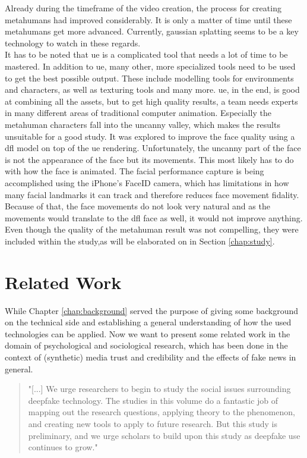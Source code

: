 \documentclass[
  a4paper,  %
  twoside,  %
  bibliography=totoc,
  headsepline,
  cleardoublepage=empty,
  parskip=half,
  draft=false
]{scrbook}
\begin{document}
Already during the timeframe of the video creation, the process for creating metahumans had improved considerably. It is only a matter of time until these metahumans get more advanced. Currently, gaussian splatting seems to be a key technology to watch in these regards. \\
It has to be noted that \gls{ue} is a complicated tool that needs a lot of time to be mastered. In addition to \gls{ue}, many other, more specialized tools need to be used to get the best possible output. These include modelling tools for environments and characters, as well as texturing tools and many more. \gls{ue}, in the end, is good at combining all the assets, but to get high quality results, a team needs experts in many different areas of traditional computer animation. Especially the metahuman characters fall into the uncanny valley, which makes the results unsuitable for a good study. It was explored to improve the face quality using a \gls{dfl} model on top of the \gls{ue} rendering. Unfortunately, the uncanny part of the face is not the appearance of the face but its movements. This most likely has to do with how the face is animated. The facial performance capture is being accomplished using the iPhone's FaceID camera, which has limitations in how many facial landmarks it can track and therefore reduces face movement fidality. Because of that, the face movements do not look very natural and as the movements would translate to the \gls{dfl} face as well, it would not improve anything. \\
Even though the quality of the metahuman result was not compelling, they were included  within the study,as will be elaborated on in Section \ref{chap:study}. 

\chapter{Related Work}
\label{chap:rel-work}
While Chapter \ref{chap:background} served the purpose of giving some background on the technical side and establishing a general understanding of how the used technologies can be applied. Now we want to present some related work in the domain of psychological and sociological research, which has been done in the context of (synthetic) media trust and credibility and the effects of fake news in general. 

\begin{quotation}
  "[...] We urge researchers to begin to study the social issues surrounding deepfake technology. The studies in this volume do a fantastic job of mapping out the research questions, applying theory to the phenomenon, and creating new tools to apply to future research. But this study is preliminary, and we urge scholars to build upon this study as deepfake use continues to grow." \cite{hancockSocialImpactDeepfakes2021}
\end{quotation}
\end{document}
